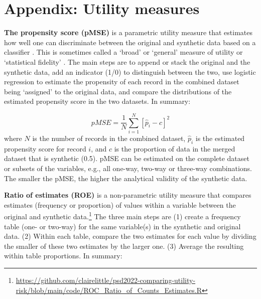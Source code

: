 \documentclass[runningheads]{llncs}
\begin{document}




\appendix
\section{Appendix: Utility measures}\label{appendix:utility_measures}
\setcounter{figure}{0}    
\setcounter{table}{0}    

{\bf The propensity score (pMSE)}  is a parametric utility measure that estimates how well one can discriminate between the original and synthetic data based on a classifier \cite{woo2009global,snoke2018general}.  This is sometimes called a `broad'\cite{snoke2018general} or `general'\cite{drechsler2009disclosure} measure of utility or `statistical fidelity' \cite{jordon2022synthetic}.  The main steps are to append or stack the original and the synthetic data, add an indicator (1/0) to distinguish between the two, use logistic regression to estimate the propensity of each record in the combined dataset being `assigned' to the original data, and compare the distributions of the estimated propensity score in the two datasets.  In summary:

\begin{equation}
pMSE = \frac{1}{N}\sum_{i=1}^{N}[\hat{p}_i - c]^2
\end{equation}
where $N$ is the number of records in the combined dataset, $\hat{p}_i$ is the estimated propensity score for record $i$, and $c$ is the proportion of data in the merged dataset that is synthetic (0.5). pMSE can be estimated on the complete dataset or subsets of the variables, e.g., all one-way, two-way or three-way combinations. The smaller the pMSE, the higher the analytical validity of the synthetic data.

{\bf Ratio of estimates (ROE)}  is a non-parametric utility measure that compares estimates (frequency or proportion) of values within a variable between the original and synthetic data.\footnote{\url{https://github.com/clairelittle/psd2022-comparing-utility-risk/blob/main/code/ROC_Ratio_of_Counts_Estimates.R}}  The three main steps are (1) create a frequency table (one- or two-way) for the same variable(s) in the synthetic and original data.  (2) Within each table, compare the two estimates for each value by dividing the smaller of these two estimates by the larger one.  (3) Average the resulting within table proportions.  In summary:
\end{document}
